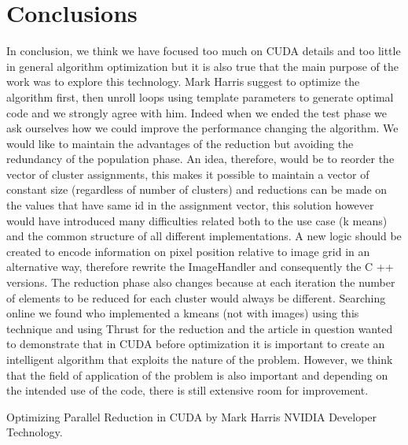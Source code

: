 \documentclass[10pt,twocolumn,letterpaper]{article}
\begin{document}
\section{Conclusions}


In conclusion, we think we have focused too much on CUDA details and too little in general algorithm optimization but it is also true that the main purpose of the work was to explore this technology.
Mark Harris suggest to optimize the algorithm first, then unroll loops using template parameters to generate optimal code and we strongly agree with him. Indeed when we ended the test phase we ask ourselves how we could improve the performance changing the algorithm. We would like to maintain the advantages of the reduction but avoiding the redundancy of the population phase. An idea, therefore, would be to reorder the vector of cluster assignments, this makes it possible to maintain a vector of constant size (regardless of number of clusters) and reductions can be made on the values ​​that have same id in the assignment vector, this solution however would have introduced many difficulties related both to the use case (k means) and the common structure of all different implementations.
A new logic should be created to encode information on pixel position relative to image grid in an alternative way, therefore rewrite the ImageHandler and consequently the C ++ versions.
The reduction phase also changes because at each iteration the number of elements to be reduced for each cluster would always be different.
Searching online we found who implemented a kmeans (not with images) using this technique and using Thrust for the reduction and the article in question wanted to demonstrate that in CUDA before optimization it is important to create an intelligent algorithm that exploits the nature of the problem.
However, we think that the field of application of the problem is also important and depending on the intended use of the code,  there is still extensive room for improvement.


{\small


Optimizing Parallel Reduction in CUDA by
Mark Harris
NVIDIA Developer Technology.
}
\end{document}
